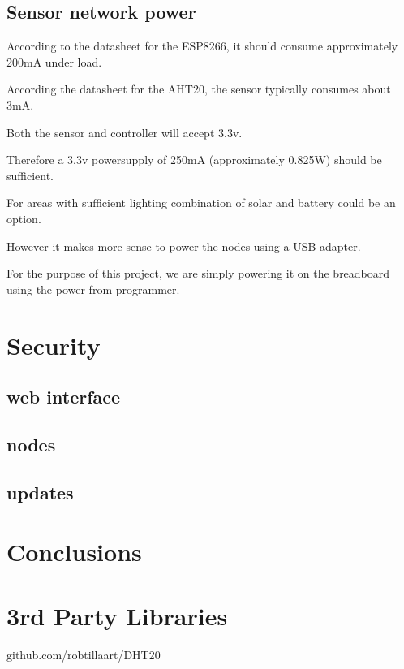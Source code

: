 \documentclass[10pt, journal]{IEEEtran} %
\begin{document}
\subsection{Sensor network power}

According to the datasheet for the ESP8266, it should consume approximately 200mA under load.

According the datasheet for the AHT20, the sensor typically consumes about 3mA.

Both the sensor and controller will accept 3.3v.

Therefore a 3.3v powersupply of 250mA (approximately 0.825W) should be sufficient.

For areas with sufficient lighting combination of solar and battery could be an option.

However it makes more sense to power the nodes using a USB adapter.

For the purpose of this project, 
we are simply powering it on the breadboard using the power from programmer.


\section{Security}


\subsection{web interface}


\subsection{nodes}


\subsection{updates}


\section{Conclusions}





\section{3rd Party Libraries}
github.com/robtillaart/DHT20
\end{document}
